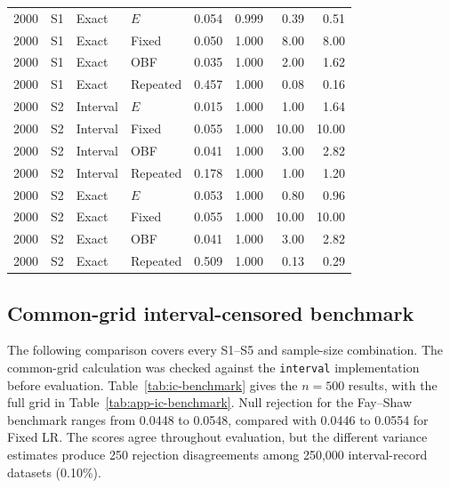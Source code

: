 \documentclass[12pt]{article}
\theoremstyle{definition}
\theoremstyle{remark}
\begin{document}
\begin{longtable}{rcllrrrr}
2000 & S1 & Exact & $E$ & 0.054 & 0.999 & 0.39 & 0.51 \\
2000 & S1 & Exact & Fixed & 0.050 & 1.000 & 8.00 & 8.00 \\
2000 & S1 & Exact & OBF & 0.035 & 1.000 & 2.00 & 1.62 \\
2000 & S1 & Exact & Repeated & 0.457 & 1.000 & 0.08 & 0.16 \\
2000 & S2 & Interval & $E$ & 0.015 & 1.000 & 1.00 & 1.64 \\
2000 & S2 & Interval & Fixed & 0.055 & 1.000 & 10.00 & 10.00 \\
2000 & S2 & Interval & OBF & 0.041 & 1.000 & 3.00 & 2.82 \\
2000 & S2 & Interval & Repeated & 0.178 & 1.000 & 1.00 & 1.20 \\
2000 & S2 & Exact & $E$ & 0.053 & 1.000 & 0.80 & 0.96 \\
2000 & S2 & Exact & Fixed & 0.055 & 1.000 & 10.00 & 10.00 \\
2000 & S2 & Exact & OBF & 0.041 & 1.000 & 3.00 & 2.82 \\
2000 & S2 & Exact & Repeated & 0.509 & 1.000 & 0.13 & 0.29 \\
\end{longtable}
\endgroup

\subsection{Common-grid interval-censored benchmark}
\label{sec:ic-benchmark}
The following comparison covers every S1--S5 and sample-size combination. The common-grid calculation was checked against the \texttt{interval} implementation before evaluation. Table~\ref{tab:ic-benchmark} gives the $n=500$ results, with the full grid in Table~\ref{tab:app-ic-benchmark}. Null rejection for the Fay--Shaw benchmark \citep{Sun1996,FayShaw2010} ranges from 0.0448 to 0.0548, compared with 0.0446 to 0.0554 for Fixed LR. The scores agree throughout evaluation, but the different variance estimates produce 250 rejection disagreements among 250,000 interval-record datasets (0.10\%).
\end{document}
